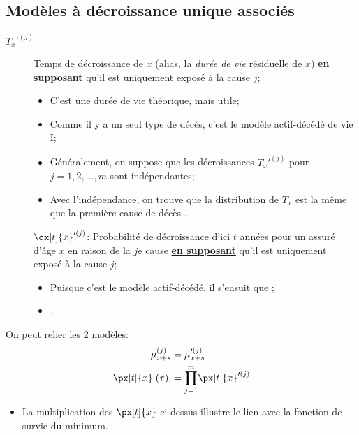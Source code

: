 \documentclass[10pt, french]{article}
\begin{document}
\begin{multicols*}{2}
\subsection*{Modèles à décroissance unique associés}
\begin{description}
	\item[$T_{x}'^{(j)}$]	Temps de décroissance de $x$ (alias, la \textit{durée de vie} résiduelle de $x$) \underline{\textbf{en supposant}} qu'il est uniquement exposé à la cause $j$;
		\begin{itemize}[leftmargin = *]
		\item	C'est une durée de vie théorique, mais utile;
		\item	Comme il y a un seul type de décès, c'est le modèle actif-décédé de vie I;
		\item	Généralement, on suppose que les décroissances $T_{x}'^{(j)}$ pour $j = 1, 2, \dots, m$ sont indépendantes;
		\item	Avec l'indépendance, on trouve que la distribution de $T_{x}$ est la même que la première cause de décès .
		\end{itemize}
	\item[]	$\qx[t]{x}'^{(j)}$:	Probabilité de décroissance d'ici $t$ années pour un assuré d'âge $x$ en raison de la $j$e cause \underline{\textbf{en supposant}} qu'il est uniquement exposé à la cause $j$;
		\begin{itemize}[leftmargin = *]
		\item	Puisque c'est le modèle actif-décédé, il s'ensuit que ;
		\item	{}.
		\end{itemize}
\end{description}

On peut relier les 2 modèles:
\begin{align*}
	\mu_{x + s}^{(j)}
	&=	\mu_{x + s}'^{(j)}	\\
	\px[t]{x}[(\tau)]
	&=	\underset{j = 1}{\overset{m}{\prod}} \px[t]{x}'^{(j)}
\end{align*}
\begin{itemize}[leftmargin = *]
	\item	 La multiplication des $\px[t]{x}$ ci-dessus illustre le lien avec la fonction de survie du minimum.
\end{itemize}


\end{multicols*}
\end{document}
